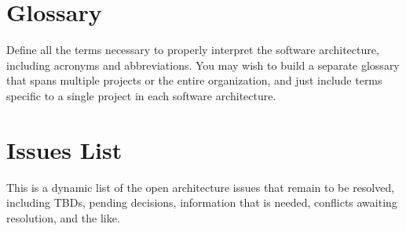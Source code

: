 \documentclass[12pt,oneside,letterpaper]{article}
\begin{document}
\appendix
\section{Glossary}
Define all the terms necessary to properly interpret the software architecture, including acronyms and abbreviations. You may wish to build a separate glossary that spans multiple projects or the entire organization, and just include terms specific to a single project in each software architecture.

\section{Issues List}
This is a dynamic list of the open architecture issues that remain to be resolved, including TBDs, pending decisions, information that is needed, conflicts awaiting resolution, and the like.
\end{document}
